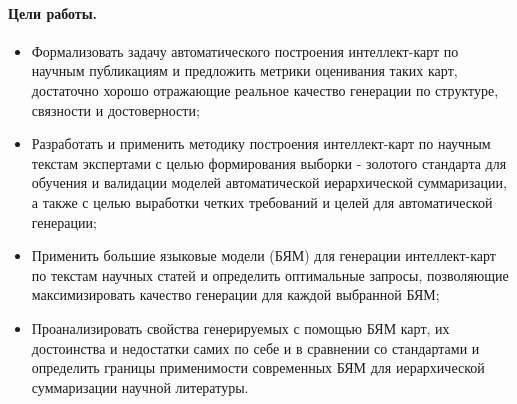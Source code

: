 \documentclass[12pt]{article}
\begin{document}



\paragraph{Цели работы.}
\begin{itemize}
    \item Формализовать задачу автоматического построения интеллект-карт по научным публикациям и предложить метрики оценивания таких карт, достаточно хорошо отражающие реальное качество генерации по структуре, связности и достоверности;
    \item Разработать и применить методику построения интеллект-карт по научным текстам экспертами с целью формирования выборки - золотого стандарта для обучения и валидации моделей автоматической иерархической суммаризации, а также с целью выработки четких требований и целей для автоматической генерации;
    \item Применить большие языковые модели (БЯМ) для генерации интеллект-карт по текстам научных статей и определить оптимальные запросы, позволяющие максимизировать качество генерации для каждой выбранной БЯМ;
    \item Проанализировать свойства генерируемых с помощью БЯМ карт, их достоинства и недостатки самих по себе и в сравнении со стандартами и определить границы применимости современных БЯМ для иерархической суммаризации научной литературы. 
\end{itemize}






\end{document}

